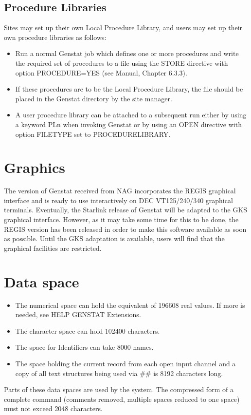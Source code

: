 \subsection{Procedure Libraries}

Sites may set up their own Local Procedure Library, and users may set
up their own procedure libraries as follows:
\begin{itemize}
\item Run a normal Genstat job which defines one or more procedures and write
 the required set of procedures to a file using the STORE directive with option
 PROCEDURE=YES (see Manual, Chapter 6.3.3).
\item If these procedures are to be the Local Procedure Library, the file
 should be placed in the Genstat directory by the site manager.
\item A user procedure library can be attached to a subsequent run either
 by using a keyword PLn when invoking Genstat or by using an OPEN directive
 with option FILETYPE set to PROCEDURELIBRARY.
\end{itemize}

\section{Graphics}

The version of Genstat received from NAG incorporates the REGIS graphical
interface and is ready to use interactively on DEC VT125/240/340 graphical
terminals.
Eventually, the Starlink release of Genstat will be adapted to the GKS
graphical interface.
However, as it may take some time for this to be done, the REGIS version
has been released in order to make this software available as soon as
possible.
Until the GKS adaptation is available, users will find that the graphical
facilities are restricted.

\section{Data space}

\begin{itemize}
\item The numerical space can hold the equivalent of 196608 real values.
 If more is needed, see HELP GENSTAT Extensions.
\item The character space can hold 102400 characters.
\item The space for Identifiers can take 8000 names.
\item The space holding the current record from each open input channel and
 a copy of all text structures being used via \#\# is 8192 characters long.
\end{itemize}
Parts of these data spaces are used by the system.
The compressed form of a complete command (comments removed, multiple
spaces reduced to one space) must not exceed 2048 characters.

